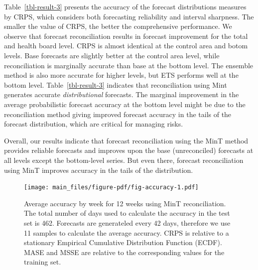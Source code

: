 \documentclass[
  authoryear,
  preprint,
  3p]{elsarticle}
\begin{document}
\begin{table}
\begin{minipage}[t]{\linewidth}
{}

\end{minipage}%

\end{table}

Table~\ref{tbl-result-3} presents the accuracy of the forecast
distributions measures by CRPS, which considers both forecasting
reliability and interval sharpness. The smaller the value of CRPS, the
better the comprehensive performance. We observe that forecast
reconciliation results in forecast improvement for the total and health
board level. CRPS is almost identical at the control area and botom
levels. Base forecasts are slightly better at the control area level,
while reconciliation is marginally accurate than base at the bottom
level. The ensemble method is also more accurate for higher levels, but
ETS performs well at the bottom level. Table~\ref{tbl-result-3}
indicates that reconciliation using Mint generates accurate
\emph{distributional} forecasts. The marginal improvement in the average
probabilistic forecast accuracy at the bottom level might be due to the
reconciliation method giving improved forecast accuracy in the tails of
the forecast distribution, which are critical for managing risks.

Overall, our results indicate that forecast reconciliation using the
MinT method provides reliable forecasts and improves upon the base
(unreconciled) forecasts at all levels except the bottom-level series.
But even there, forecast reconciliation using MinT improves accuracy in
the tails of the distribution.

\begin{figure}[H]

{\centering \texttt{[image: main\_files/figure-pdf/fig-accuracy-1.pdf]}

}

\caption{\label{fig-accuracy}Average accuracy by week for 12 weeks using
MinT reconciliation. The total number of days used to calculate the
accuracy in the test set is 462. Forecasts are generateled every 42
days, therefore we use 11 samples to calculate the average accuracy.
CRPS is relative to a stationary Empirical Cumulative Distribution
Function (ECDF). MASE and MSSE are relative to the corresponding values
for the training set.}

\end{figure}
\end{document}
